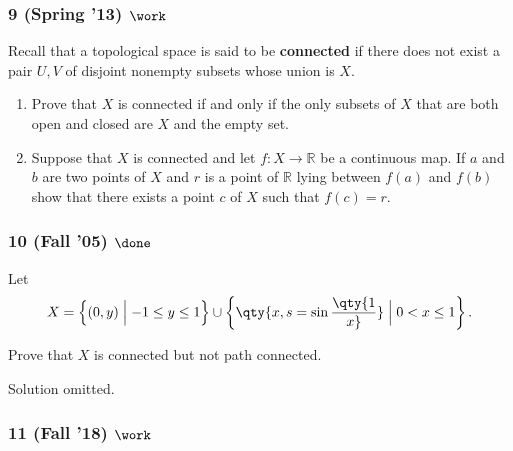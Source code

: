 \hypertarget{spring-13-work}{%
\subsubsection{\texorpdfstring{9 (Spring '13)
\(\work\)}{9 (Spring '13) \textbackslash work}}\label{spring-13-work}}

\begin{problem}[?]

Recall that a topological space is said to be \textbf{connected} if
there does not exist a pair \(U, V\) of disjoint nonempty subsets whose
union is \(X\).

\begin{enumerate}
\def\labelenumi{\alph{enumi}.}
\item
  Prove that \(X\) is connected if and only if the only subsets of \(X\)
  that are both open and closed are \(X\) and the empty set.
\item
  Suppose that \(X\) is connected and let \(f : X \to {\mathbb{R}}\) be
  a continuous map. If \(a\) and \(b\) are two points of \(X\) and \(r\)
  is a point of \({\mathbb{R}}\) lying between \(f (a)\) and \(f (b)\)
  show that there exists a point \(c\) of \(X\) such that \(f (c) = r\).
\end{enumerate}

\end{problem}

\hypertarget{fall-05-done-1}{%
\subsubsection{\texorpdfstring{10 (Fall '05)
\(\done\)}{10 (Fall '05) \textbackslash done}}\label{fall-05-done-1}}

\begin{problem}[?]

Let
\begin{align*}
X = \left\{{(0, y) \mathrel{\Big|}- 1 \leq y \leq 1}\right\} \cup \left\{{\qty{x, s = \sin\qty{1 \over x}} \mathrel{\Big|}0 < x \leq 1}\right\}
.\end{align*}

Prove that \(X\) is connected but not path connected.

\end{problem}

Solution omitted.

\hypertarget{fall-18-work-1}{%
\subsubsection{\texorpdfstring{11 (Fall '18)
\(\work\)}{11 (Fall '18) \textbackslash work}}\label{fall-18-work-1}}

